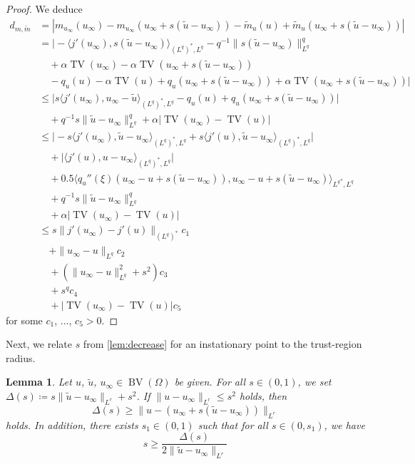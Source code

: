 \documentclass[11pt]{article}
\DeclareMathOperator*{\BV}{BV}
\DeclareMathOperator*{\TV}{TV}
\newtheorem{lemma}[theorem]{Lemma}
\theoremstyle{definition}
\theoremstyle{remark}
\begin{document}
\begin{proof}
We deduce
%
\begin{align*}
d_{m,\tilde{m}} &= |m_{u_\infty}(u_\infty) - m_{u_\infty}(u_\infty + s(\tilde{u} - u_\infty))
- \tilde{m}_u(u) + \tilde{m}_u(u_\infty + s(\tilde{u} - u_\infty))|
\\
&= \Big|- \langle j'(u_\infty), s(\tilde{u} - u_\infty)\rangle_{(L^{q})^*,L^{q}} - q^{-1}\|s(\tilde{u} - u_\infty)\|_{L^{q}}^{q}\\
&\quad + \alpha \TV(u_\infty)
- \alpha \TV(u_\infty + s(\tilde{u} - u_\infty))\\
&\quad - q_u(u) - \alpha \TV(u)
+ q_u(u_\infty + s(\tilde{u} - u_\infty))
+ \alpha \TV(u_\infty + s(\tilde{u} - u_\infty))\Big|\\
&\le 
\big|
s \langle j'(u_\infty), u_\infty - \tilde{u} \rangle_{(L^q)^*,L^q} - q_u(u) + q_u(u_\infty + s(\tilde{u} - u_\infty)) \big|\\
&\quad + q^{-1}s\|\tilde{u} - u_\infty\|_{L^q}^{q}
+ \alpha|\TV(u_\infty) - \TV(u)| \\
&\le 
\big|
- s \langle j'(u_\infty), \tilde{u} - u_\infty  \rangle_{(L^q)^*,L^q} + 
s \langle j'(u), \tilde{u} - u_\infty\rangle_{(L^q)^*,L^q}\big| \\
&\quad + \big|\langle j'(u), u - u_\infty\rangle_{(L^q)^*,L^q}\big| \\
&\quad + 0.5\langle q_u''(\xi)(u_\infty - u + s(\tilde{u} - u_\infty)), u_\infty - u + s(\tilde{u} - u_\infty)\rangle_{{L^q}^*, L^q} \\
&\quad + q^{-1}s\|\tilde{u} - u_\infty\|_{L^q}^{q} \\
&\quad + \alpha|\TV(u_\infty) - \TV(u)| \\
&\le s \|j'(u_\infty) - j'(u)\|_{(L^q)^*}  c_1 \\
&\quad + \|u_\infty - u\|_{L^q} c_2\\
&\quad + (\|u_\infty - u\|_{L^q}^2 + s^2)c_3 \\
&\quad + s^q c_4 \\
&\quad + |\TV(u_\infty) - \TV(u)|c_5
\end{align*}
%
for some $c_1$, $\ldots$, $c_5 > 0$.
\end{proof}
%
Next, we relate $s$ from \cref{lem:decrease}
for an instationary point to the trust-region
radius.
%
\begin{lemma}\label{lem:s_trradius_relation}
Let $u$, $\tilde{u}$, $u_\infty \in \BV(\Omega)$
be given. For all $s \in (0,1)$, we set
$\Delta(s) \coloneqq s\|\tilde{u} - u_\infty\|_{L^r} + s^2$. If $\|u - u_\infty\|_{L^r} \le s^2$
holds, then 
%
\[ \Delta(s) \ge \|u - (u_\infty + s(\tilde{u} - u_\infty))\|_{L^r}
\]
%
holds. In addition, there exists $s_1 \in (0,1)$ such 
that for all $s \in (0,s_1)$, we have 
%
\[ s \ge \frac{\Delta(s)}{2\|\tilde{u} - u_\infty\|_{L^r}}
\]
\end{lemma}
\end{document}
